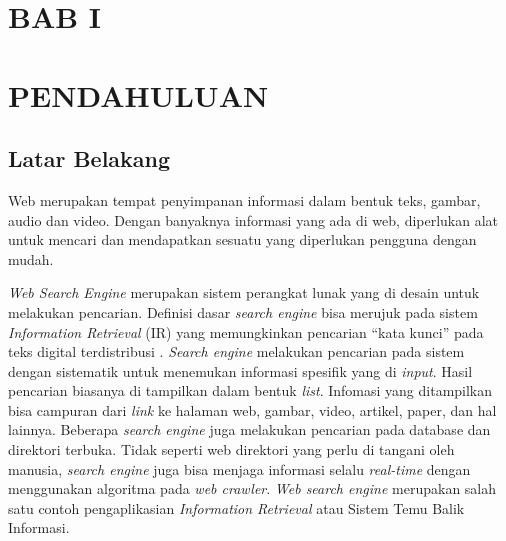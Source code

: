 \documentclass[12pt]{report}
\renewcommand{\thefigure}{\arabic{section}.\arabic{figure}}
\renewcommand{\thetable}{\arabic{section}.\arabic{table}}
\begin{document}
\cleardoublepage
{}
\setlength{\cftbeforelottitleskip}{0pt}
\setlength{\cftafterlottitleskip}{20pt}
\listoftables



\linespread{1.6}\selectfont

\renewcommand\thefigure{\normalsize Gambar \arabic{section}.\arabic{figure} :}
\renewcommand\thetable{\normalsize Tabel \arabic{section}.\arabic{table} :}
\renewcommand\thesection{\normalsize BAB \Roman{section}}
\renewcommand\thesubsection{\normalsize  \Alph{subsection}.}
\renewcommand\thesubsubsection{\normalsize  \arabic{subsubsection}.}

\captionsetup[figure]{labelsep=space}
\captionsetup[table]{labelsep=space}

\setlength{\LTpre}{0pt}
\setlength{\LTpost}{0pt}

\newpage
\pagestyle{fancy}
\fancyhead{}
\fancyhead[CF]{}
\fancyhead[LH]{}
\fancyhead[RH]{\thepage}
\renewcommand{\headrulewidth}{0pt}
\section[PENDAHULUAN]{BAB I}
\section*{PENDAHULUAN}
\thispagestyle{plain}

\subsection{Latar Belakang}
Web merupakan tempat penyimpanan informasi dalam bentuk teks, gambar, audio dan video. Dengan banyaknya informasi yang ada di web, diperlukan alat untuk mencari dan mendapatkan sesuatu yang diperlukan pengguna dengan mudah.

\textit{Web Search Engine} merupakan sistem perangkat lunak yang di desain untuk melakukan pencarian. Definisi dasar \textit{search engine} bisa merujuk pada sistem \textit{Information Retrieval} (IR) yang memungkinkan pencarian ``kata kunci'' pada teks digital terdistribusi \cite{halavais2017search}. \textit{Search engine} melakukan pencarian pada sistem dengan sistematik untuk menemukan informasi spesifik yang di \textit{input}. Hasil pencarian biasanya di tampilkan dalam bentuk \textit{list}. Infomasi yang ditampilkan bisa campuran dari \textit{link} ke halaman web, gambar, video, artikel, paper, dan hal lainnya. Beberapa \textit{search engine} juga melakukan pencarian pada database dan direktori terbuka. Tidak seperti web direktori yang perlu di tangani oleh manusia, \textit{search engine} juga bisa menjaga informasi selalu \textit{real-time} dengan menggunakan algoritma pada \textit{web crawler}. \textit{Web search engine} merupakan salah satu contoh pengaplikasian \textit{Information Retrieval} atau Sistem Temu Balik Informasi.
\end{document}
